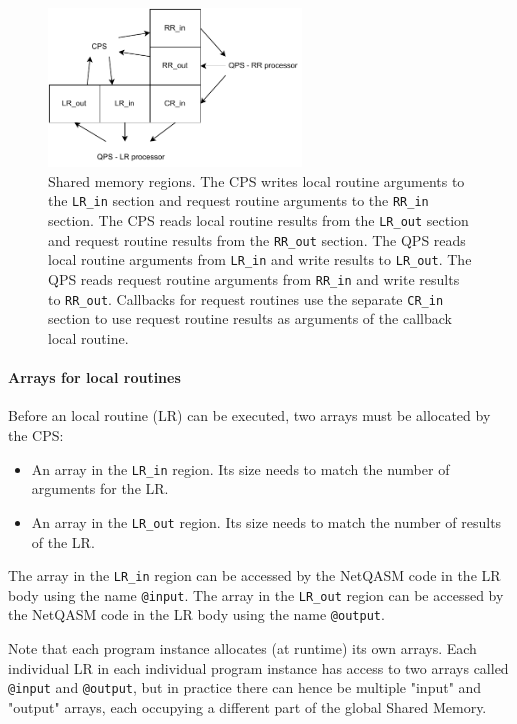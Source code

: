 \begin{figure}[t]
    \centering
    \includegraphics[width=0.6\textwidth]{figures/qoala/shared_memory.pdf}
    \caption{Shared memory regions.
    The CPS writes local routine arguments to the \texttt{LR\_in} section and request routine arguments to the \texttt{RR\_in} section.
    The CPS reads local routine results from the \texttt{LR\_out} section and request routine results from the \texttt{RR\_out} section.
    The QPS reads local routine arguments from \texttt{LR\_in} and write results to \texttt{LR\_out}.
    The QPS reads request routine arguments from \texttt{RR\_in} and write results to \texttt{RR\_out}.
    Callbacks for request routines use the separate \texttt{CR\_in} section to use request routine results as arguments of the callback local routine.
    }
    \label{qoala:fig:app:shared_memory}
\end{figure}


\paragraph{Arrays for local routines}
Before an local routine (LR) can be executed, two arrays must be allocated by the CPS:
\begin{itemize}
\item An array in the \texttt{LR\_in} region. Its size needs to match the number of arguments for the LR.
\item An array in the \texttt{LR\_out} region. Its size needs to match the number of results of the LR.
\end{itemize}

The array in the \texttt{LR\_in} region can be accessed by the NetQASM code in the LR body using the name \texttt{@input}.
The array in the \texttt{LR\_out} region can be accessed by the NetQASM code in the LR body using the name \texttt{@output}.

Note that each program instance allocates (at runtime) its own arrays. Each individual LR in each individual program instance has access to two arrays called \texttt{@input}  and \texttt{@output}, but in practice there can hence be multiple "input" and "output" arrays, each occupying a different part of the global Shared Memory.


